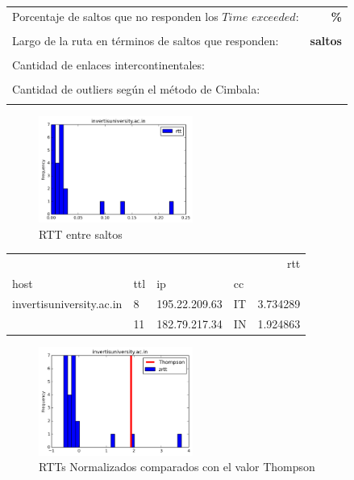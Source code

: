 \begin{center}
\begin{tabular}{p{6.5cm}r}
Porcentaje de saltos que no responden los $Time$ $exceeded$: & \textbf{\%} \\ \\ 
Largo de la ruta en términos de saltos que responden: &\textbf{ saltos} \\ \\
Cantidad de enlaces intercontinentales: & \textbf{} \\ \\
Cantidad de outliers según el método de Cimbala: & \textbf{} \\ \\
\end{tabular}
\end{center}

\begin{figure}[H]
  \centering
    \includegraphics[width=0.45\textwidth]{histogramas_rtt/invertisuniversity-ac-in.png}
  \caption{RTT entre saltos}
  \label{entropia-s}
\end{figure}

\begin{center}
\begin{tabular}{llllr}
\toprule
                         &    &               &    &       rtt \\
host & ttl & ip & cc &           \\
\midrule
invertisuniversity.ac.in & 8  & 195.22.209.63 & IT &  3.734289 \\
                         & 11 & 182.79.217.34 & IN &  1.924863 \\
\bottomrule
\end{tabular}

\end{center}

\begin{figure}[H]
  \centering
    \includegraphics[width=0.45\textwidth]{histogramas_thompson/invertisuniversity-ac-in.png}
  \caption{RTTs Normalizados comparados con el valor Thompson}
  \label{entropia-s}
\end{figure}

